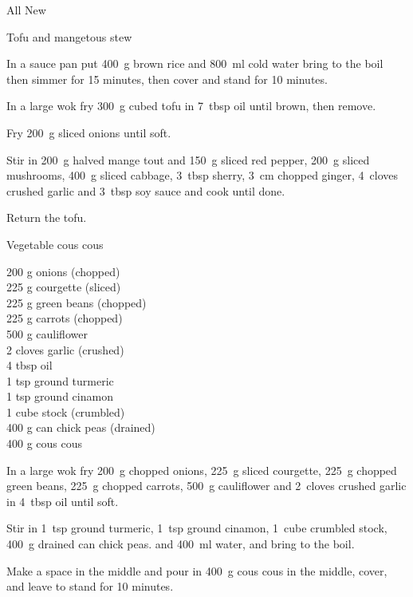 \begin{menu}{All New}
\begin{recipe}{2}{Tofu and mangetous stew}
    \begin{instructions}
    \item 
      In a
      sauce pan
      put
      400~g  brown rice
      and
      800~ml  cold water
      bring to the boil then simmer for 15 minutes,
      then cover and stand for 10 minutes.
    \item 
        In a large wok fry
        300~g cubed tofu
        in
        7~tbsp  oil
        until brown, then remove.
      \item 
        Fry 200~g sliced onions until soft.
      \item 
        Stir in
        200~g halved mange tout
        and
        150~g sliced red pepper,
        200~g sliced mushrooms,
        400~g sliced cabbage,
        3~tbsp  sherry,
        3~cm chopped ginger,
        4~cloves crushed garlic
        and
        3~tbsp  soy sauce
        and cook until done.
      \item 
        Return the tofu.
      
    \end{instructions}
    \end{recipe}%
  
    \begin{recipe}{2}{Vegetable cous cous}%
    
		\begin{ingredients}
		200 g onions (chopped) \\
	225 g courgette (sliced) \\
	225 g green beans (chopped) \\
	225 g carrots (chopped) \\
	500 g cauliflower  \\
	2 cloves garlic (crushed) \\
	4 tbsp oil  \\
	1 tsp ground turmeric  \\
	1 tsp ground cinamon  \\
	1 cube stock (crumbled) \\
	400 g can chick peas (drained) \\
	400 g cous cous  \\
	
		\end{ingredients}
	
    \begin{instructions}
    \item 
        In a large wok fry
        200~g chopped onions,
        225~g sliced courgette,
        225~g chopped green beans,
        225~g chopped carrots,
        500~g  cauliflower
        and
        2~cloves crushed garlic
        in
        4~tbsp  oil
        until soft.
      \item 
        Stir in
        1~tsp  ground turmeric,
        1~tsp  ground cinamon,
        1~cube crumbled stock,
        400~g drained can chick peas.
        and
        400~ml  water,
        and bring to the boil.
      \item 
        Make a space in the middle and pour in
        400~g  cous cous
        in the middle, cover,
        and leave to stand for 10 minutes.
      

\end{instructions}
\end{recipe}
\end{menu}
